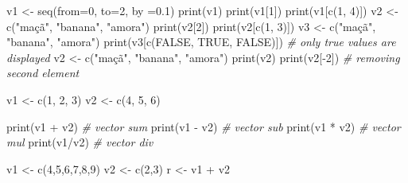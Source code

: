 \documentclass[
]{article}
\newenvironment{Shaded}{\begin{snugshade}}{\end{snugshade}}
\newcommand{\AttributeTok}[1]{\textcolor[rgb]{0.77,0.63,0.00}{#1}}
\newcommand{\CommentTok}[1]{\textcolor[rgb]{0.56,0.35,0.01}{\textit{#1}}}
\newcommand{\ConstantTok}[1]{\textcolor[rgb]{0.00,0.00,0.00}{#1}}
\newcommand{\DecValTok}[1]{\textcolor[rgb]{0.00,0.00,0.81}{#1}}
\newcommand{\FloatTok}[1]{\textcolor[rgb]{0.00,0.00,0.81}{#1}}
\newcommand{\FunctionTok}[1]{\textcolor[rgb]{0.00,0.00,0.00}{#1}}
\newcommand{\NormalTok}[1]{#1}
\newcommand{\OtherTok}[1]{\textcolor[rgb]{0.56,0.35,0.01}{#1}}
\newcommand{\SpecialCharTok}[1]{\textcolor[rgb]{0.00,0.00,0.00}{#1}}
\newcommand{\StringTok}[1]{\textcolor[rgb]{0.31,0.60,0.02}{#1}}
\begin{document}
\begin{Shaded}
\begin{Highlighting}[]
\NormalTok{v1 }\OtherTok{\textless{}{-}} \FunctionTok{seq}\NormalTok{(}\AttributeTok{from=}\DecValTok{0}\NormalTok{, }\AttributeTok{to=}\DecValTok{2}\NormalTok{, }\AttributeTok{by =}\FloatTok{0.1}\NormalTok{) }
\FunctionTok{print}\NormalTok{(v1)}
\FunctionTok{print}\NormalTok{(v1[}\DecValTok{1}\NormalTok{])}
\FunctionTok{print}\NormalTok{(v1[}\FunctionTok{c}\NormalTok{(}\DecValTok{1}\NormalTok{, }\DecValTok{4}\NormalTok{)])}
\NormalTok{v2 }\OtherTok{\textless{}{-}} \FunctionTok{c}\NormalTok{(}\StringTok{"maçã"}\NormalTok{, }\StringTok{"banana"}\NormalTok{, }\StringTok{"amora"}\NormalTok{)}
\FunctionTok{print}\NormalTok{(v2[}\DecValTok{2}\NormalTok{])}
\FunctionTok{print}\NormalTok{(v2[}\FunctionTok{c}\NormalTok{(}\DecValTok{1}\NormalTok{, }\DecValTok{3}\NormalTok{)])}
\NormalTok{v3 }\OtherTok{\textless{}{-}} \FunctionTok{c}\NormalTok{(}\StringTok{"maçã"}\NormalTok{, }\StringTok{"banana"}\NormalTok{, }\StringTok{"amora"}\NormalTok{)}
\FunctionTok{print}\NormalTok{(v3[}\FunctionTok{c}\NormalTok{(}\ConstantTok{FALSE}\NormalTok{, }\ConstantTok{TRUE}\NormalTok{, }\ConstantTok{FALSE}\NormalTok{)]) }\CommentTok{\# only true values are displayed}
\NormalTok{v2 }\OtherTok{\textless{}{-}} \FunctionTok{c}\NormalTok{(}\StringTok{"maçã"}\NormalTok{, }\StringTok{"banana"}\NormalTok{, }\StringTok{"amora"}\NormalTok{)}
\FunctionTok{print}\NormalTok{(v2)}
\FunctionTok{print}\NormalTok{(v2[}\SpecialCharTok{{-}}\DecValTok{2}\NormalTok{]) }\CommentTok{\# removing second element}

\NormalTok{v1 }\OtherTok{\textless{}{-}} \FunctionTok{c}\NormalTok{(}\DecValTok{1}\NormalTok{, }\DecValTok{2}\NormalTok{, }\DecValTok{3}\NormalTok{)}
\NormalTok{v2 }\OtherTok{\textless{}{-}} \FunctionTok{c}\NormalTok{(}\DecValTok{4}\NormalTok{, }\DecValTok{5}\NormalTok{, }\DecValTok{6}\NormalTok{)}

\FunctionTok{print}\NormalTok{(v1 }\SpecialCharTok{+}\NormalTok{ v2) }\CommentTok{\# vector sum}
\FunctionTok{print}\NormalTok{(v1 }\SpecialCharTok{{-}}\NormalTok{ v2) }\CommentTok{\# vector sub}
\FunctionTok{print}\NormalTok{(v1 }\SpecialCharTok{*}\NormalTok{ v2) }\CommentTok{\# vector mul}
\FunctionTok{print}\NormalTok{(v1}\SpecialCharTok{/}\NormalTok{v2) }\CommentTok{\# vector div}

\NormalTok{v1 }\OtherTok{\textless{}{-}} \FunctionTok{c}\NormalTok{(}\DecValTok{4}\NormalTok{,}\DecValTok{5}\NormalTok{,}\DecValTok{6}\NormalTok{,}\DecValTok{7}\NormalTok{,}\DecValTok{8}\NormalTok{,}\DecValTok{9}\NormalTok{)}
\NormalTok{v2 }\OtherTok{\textless{}{-}} \FunctionTok{c}\NormalTok{(}\DecValTok{2}\NormalTok{,}\DecValTok{3}\NormalTok{)}
\NormalTok{r }\OtherTok{\textless{}{-}}\NormalTok{ v1 }\SpecialCharTok{+}\NormalTok{ v2}


\end{Highlighting}
\end{Shaded}
\end{document}
